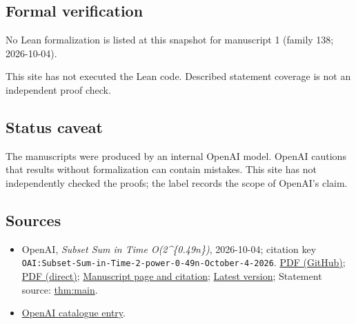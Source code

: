 \documentclass[11pt]{article}
\begin{document}
\subsection{Formal verification}
No Lean formalization is listed at this snapshot for manuscript 1 (family 138; 2026-10-04).

This site has not executed the Lean code. Described statement coverage is not an independent proof check.

\subsection{Status caveat}
The manuscripts were produced by an internal OpenAI model. OpenAI cautions that results without formalization can contain mistakes. This site has not independently checked the proofs; the label records the scope of OpenAI's claim.

\subsection{Sources}
\begin{itemize}
\item OpenAI, \emph{Subset Sum in Time O(2\textasciicircum{}\{0.49n\})}, 2026-10-04; citation key \texttt{OAI:Subset-Sum-in-Time-2-power-0-49n-October-4-2026}. \href{https://github.com/openai/math/blob/adc7f1241b42e322a6451854ab7e4b4c146bf78a/preprints/Subset-Sum-in-Time-2-power-0-49n-October-4-2026/subset-sum.pdf}{PDF (GitHub)}; \href{https://github.com/openai/math/raw/adc7f1241b42e322a6451854ab7e4b4c146bf78a/preprints/Subset-Sum-in-Time-2-power-0-49n-October-4-2026/subset-sum.pdf}{PDF (direct)}; \href{https://github.com/openai/math/blob/adc7f1241b42e322a6451854ab7e4b4c146bf78a/preprints/Subset-Sum-in-Time-2-power-0-49n-October-4-2026/README.md}{Manuscript page and citation}; \href{https://github.com/openai/math/blob/main/preprints/Subset-Sum-in-Time-2-power-0-49n-October-4-2026/subset-sum.pdf}{Latest version}; Statement source: \href{https://github.com/openai/math/blob/adc7f1241b42e322a6451854ab7e4b4c146bf78a/preprints/Subset-Sum-in-Time-2-power-0-49n-October-4-2026/build/sections/introduction.tex\#L58}{thm:main}.
\item \href{https://github.com/openai/math/blob/adc7f1241b42e322a6451854ab7e4b4c146bf78a/CONTENTS.md}{OpenAI catalogue entry}.
\end{itemize}
\end{document}

